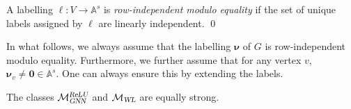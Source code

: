 \begin{definition}\label{def:label2}\normalfont
	A labelling $\pmb{\ell}:V\to\mathbb{A}^s$ is \textit{row-independent modulo equality} if the set of unique labels assigned by $\pmb{\ell}$ are linearly independent. \qed
\end{definition}
In what follows, we always assume that the labelling $\pmb{\nu}$ of $G$ is row-independent modulo equality. Furthermore, we further assume that for any vertex $v$, $\pmb{\nu}_v\neq\mathbf{0}\in\mathbb{A}^s$. One can always ensure this by extending the labels. 
%
\begin{proposition}
The classes $\mathcal{M}_{\textsl{GNN}}^{\textsl{ReLU}}$ and  $\mathcal{M}_{\textsl{WL}}$ are equally strong.
\end{proposition}
